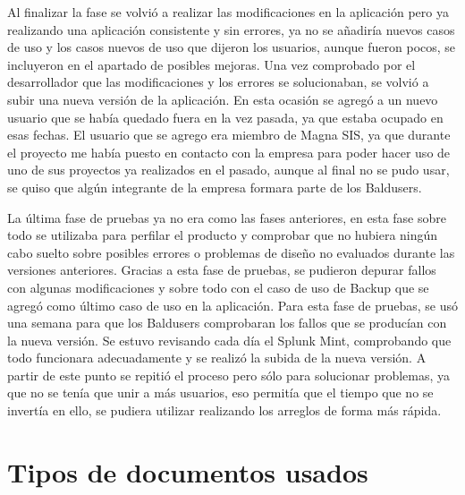 Al finalizar la fase se volvió a realizar las modificaciones en la aplicación pero ya realizando una aplicación consistente y sin errores, ya no se añadiría nuevos casos de uso y los casos nuevos de uso que dijeron los usuarios, aunque fueron pocos, se incluyeron en el apartado de posibles mejoras.
Una vez comprobado por el desarrollador que las modificaciones y los errores se solucionaban, se volvió a subir una nueva versión de la aplicación. En esta ocasión se agregó a un nuevo usuario que se había quedado fuera en la vez pasada, ya que estaba ocupado en esas fechas.
El usuario que se agrego era miembro de Magna SIS, ya que durante el proyecto me había puesto en contacto con la empresa para poder hacer uso de uno de sus proyectos ya realizados en el pasado, aunque al final no se pudo usar, se quiso que algún integrante de la empresa formara parte de los Baldusers.

La última fase de pruebas ya no era como las fases anteriores, en esta fase sobre todo se utilizaba para perfilar el producto y comprobar que no hubiera ningún cabo suelto sobre posibles errores o problemas de diseño no evaluados durante las versiones anteriores.
Gracias a esta fase de pruebas, se pudieron depurar fallos con algunas modificaciones y sobre todo con el caso de uso de Backup que se agregó como último caso de uso en la aplicación.
Para esta fase de pruebas, se usó una semana para que los Baldusers comprobaran los fallos que se producían con la nueva versión.
Se estuvo revisando cada día el Splunk Mint, comprobando que todo funcionara adecuadamente y se realizó la subida de la nueva versión.
A partir de este punto se repitió el proceso pero sólo para solucionar problemas, ya que no se tenía que unir a más usuarios, eso permitía que el tiempo que no se invertía en ello, se pudiera utilizar realizando los arreglos de forma más rápida.



\section{Tipos de documentos usados}
\label{secc:tipos de documentos usados}

